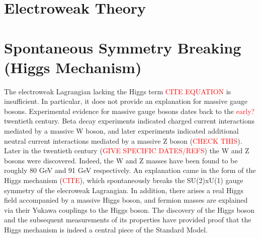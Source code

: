 \section{Electroweak Theory}


\section{Spontaneous Symmetry Breaking (Higgs Mechanism)}
The electroweak Lagrangian lacking the Higgs term \textcolor{red}{CITE EQUATION} is insufficient. In particular, it does not provide
an explanation for massive gauge bosons. Experimental evidence for massive gauge bosons dates back to the \textcolor{red}{early?}
twentieth century. Beta decay experiments indicated charged current interactions mediated by a massive W boson, and later experiments 
indicated additional neutral current interactions mediated by a massive Z boson (\textcolor{red}{CHECK THIS}). Later in the twentieth 
century (\textcolor{red}{GIVE SPECIFIC DATES/REFS}) the W and Z bosons were discovered. Indeed, the W and Z masses have been found 
to be roughly 80 GeV and 91 GeV respectively. An explanation came in the form of the Higgs mechanism (\textcolor{red}{CITE}),
which spontaneously breaks the SU(2)xU(1) gauge symmetry of the elecroweak Lagrangian. In addition, there arises a real 
Higgs field accompanied by a massive Higgs boson, and fermion masses are explained via their Yukawa couplings to the Higgs boson. 
The discovery of the Higgs boson and the subsequent measurements of its properties have provided proof that the Higgs mechanism 
is indeed a central piece of the Standard Model. 

